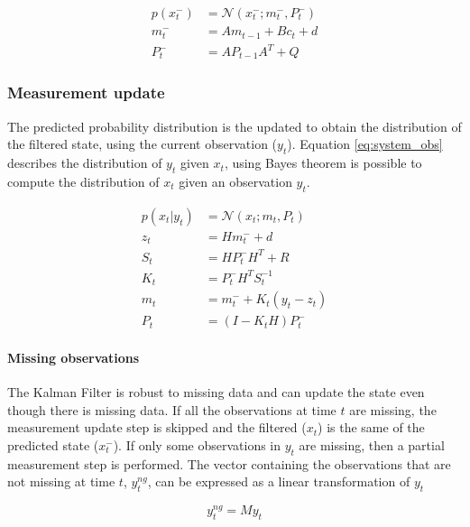 \documentclass{article}
\newcommand{\norm}[3]{\mathcal{N}\left(#1; #2, #3\right)} %
\begin{document}
\begin{align}\label{eq:time_update}
    p(x^-_t) &= \norm{x_t^-}{m_t^-}{ P_t^-}\\
    m_t^- &= Am_{t-1} + B c_t + d \label{eq:time_update_mean}\\
    P_t^- &= AP_{t-1}A^T + Q \label{eq:time_update_cov}
\end{align} 

\pagebreak

\subsubsection{Measurement update}

The predicted probability distribution is the updated to obtain the distribution of the filtered state, using the current observation ($y_t$). Equation \ref{eq:system_obs} describes the distribution of $y_t$ given $x_t$, using Bayes theorem is possible to compute the distribution of $x_t$ given an observation $y_t$.

\begin{align}
 p(x_t|y_t) &= \mathcal{N}(x_t; m_t, P_t) \label{eq:meas_update}\\
 z_t &= Hm_t^- + d \label{eq:meas_update:obs_mean}\\
 S_t &= HP_t^-H^T + R \label{eq:meas_update:obs_cov}\\
 K_t &= P_t^-H^TS_t^{-1} \label{eq:meas_update:kalman_gain}\\
 m_t &= m_t^- + K_t(y_t - z_t) \label{eq:meas_update:state_mean}\\
 P_t &= (I-K_tH)P_t^- \label{eq:meas_update:state_cov}
\end{align}
    
\paragraph{Missing observations}

The Kalman Filter is robust to missing data and can update the state even though there is missing data. 
If all the observations at time $t$ are missing, the measurement update step is skipped and the filtered ($x_t$) is the same of the predicted state ($x_t^-$). If only some observations in $y_t$ are missing, then a partial measurement step is performed.
The vector containing the observations that are not missing at time $t$, $y^{ng}_t$, can be expressed as a linear transformation of $y_t$

\begin{equation}\label{eq:miss_obs}
    y^{ng}_t = My_t
\end{equation}
\end{document}
